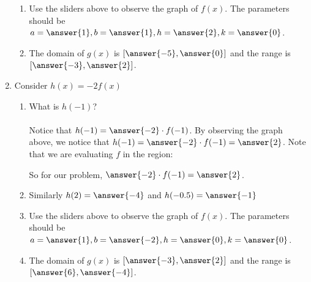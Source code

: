 \documentclass{ximera}
\begin{document}
\begin{question}
\begin{enumerate}
\begin{enumerate}
\item Use the sliders above to observe the graph of $f(x)$.  The parameters should be $a=\answer{1}, b=\answer{1}, h=\answer{2}, k=\answer{0}$.

\item The domain of $g(x)$ is $[\answer{-5}, \answer{0}]$ and the range is $[\answer{-3}, \answer{2}]$.

\end{enumerate}


\item Consider $h(x)=-2f(x)$
\begin{enumerate}
\item What is $h(-1)$?  \\ \\ Notice that $h(-1)=\answer{-2}\cdot f(-1)$.  By observing the graph above, we notice that $h(-1)=\answer{-2}\cdot f(-1)=\answer{2}$.  Note that we are evaluating $f$ in the region:

\begin{multipleChoice}
\end{multipleChoice}

So for our problem, $\answer{-2}\cdot f(-1)=\answer{2}$.

\item Similarly $h(2)=\answer{-4}$ and $h(-0.5)=\answer{-1}$

\item Use the sliders above to observe the graph of $f(x)$.  The parameters should be $a=\answer{1}, b=\answer{-2}, h=\answer{0}, k=\answer{0}$.

\item The domain of $g(x)$ is $[\answer{-3}, \answer{2}]$ and the range is $[\answer{6}, \answer{-4}]$.

\end{enumerate}





\end{enumerate}

\end{question}
\end{document}
